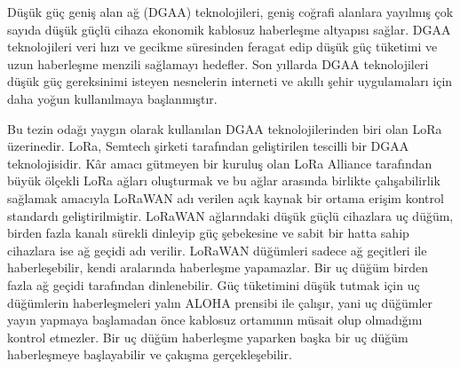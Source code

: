 Düşük güç geniş alan ağ (DGAA) teknolojileri, geniş coğrafi alanlara yayılmış çok sayıda düşük güçlü cihaza ekonomik kablosuz haberleşme altyapısı sağlar. DGAA teknolojileri veri hızı ve gecikme süresinden feragat edip düşük güç tüketimi ve uzun haberleşme menzili sağlamayı hedefler. Son yıllarda DGAA teknolojileri düşük güç gereksinimi isteyen nesnelerin interneti ve akıllı şehir uygulamaları için daha yoğun kullanılmaya başlanmıştır.

Bu tezin odağı yaygın olarak kullanılan DGAA teknolojilerinden biri olan LoRa üzerinedir. LoRa, Semtech şirketi tarafından geliştirilen tescilli bir DGAA teknolojisidir. Kâr amacı gütmeyen bir kuruluş olan LoRa Alliance tarafından büyük ölçekli LoRa ağları oluşturmak ve bu ağlar arasında birlikte çalışabilirlik sağlamak amacıyla LoRaWAN adı verilen açık kaynak bir ortama erişim kontrol standardı geliştirilmiştir. LoRaWAN ağlarındaki düşük güçlü cihazlara uç düğüm, birden fazla kanalı sürekli dinleyip güç şebekesine ve sabit bir hatta sahip cihazlara ise ağ geçidi adı verilir. LoRaWAN düğümleri sadece ağ geçitleri ile haberleşebilir, kendi aralarında haberleşme yapamazlar. Bir uç düğüm birden fazla ağ geçidi tarafından dinlenebilir. Güç tüketimini düşük tutmak için uç düğümlerin haberleşmeleri yalın ALOHA prensibi ile çalışır, yani uç düğümler yayın yapmaya başlamadan önce kablosuz ortamının müsait olup olmadığını kontrol etmezler. Bir uç düğüm haberleşme yaparken başka bir uç düğüm haberleşmeye başlayabilir ve çakışma gerçekleşebilir.

